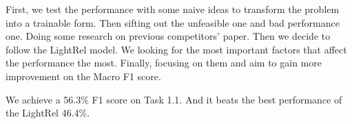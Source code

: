 First, we test the performance with some naive ideas to transform the problem into a trainable form. Then sifting out the unfeasible one and bad performance one. Doing some research on previous competitors' paper. Then we decide to follow the LightRel model. We looking for the most important factors that affect the performance the most. Finally, focusing on them and aim to gain more improvement on the Macro F1 score.

We achieve a 56.3\% F1 score on Task 1.1. And it beats the best performance of the LightRel 46.4\%.